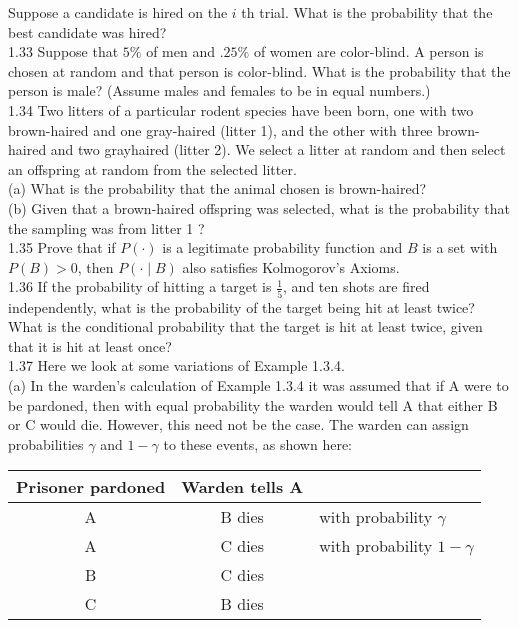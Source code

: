 \documentclass[10pt]{article}
\begin{document}
Suppose a candidate is hired on the $i$ th trial. What is the probability that the best candidate was hired?\\
1.33 Suppose that $5 \%$ of men and $.25 \%$ of women are color-blind. A person is chosen at random and that person is color-blind. What is the probability that the person is male? (Assume males and females to be in equal numbers.)\\
1.34 Two litters of a particular rodent species have been born, one with two brown-haired and one gray-haired (litter 1), and the other with three brown-haired and two grayhaired (litter 2). We select a litter at random and then select an offspring at random from the selected litter.\\
(a) What is the probability that the animal chosen is brown-haired?\\
(b) Given that a brown-haired offspring was selected, what is the probability that the sampling was from litter 1 ?\\
1.35 Prove that if $P(\cdot)$ is a legitimate probability function and $B$ is a set with $P(B)>0$, then $P(\cdot \mid B)$ also satisfies Kolmogorov's Axioms.\\
1.36 If the probability of hitting a target is $\frac{1}{5}$, and ten shots are fired independently, what is the probability of the target being hit at least twice? What is the conditional probability that the target is hit at least twice, given that it is hit at least once?\\
1.37 Here we look at some variations of Example 1.3.4.\\
(a) In the warden's calculation of Example 1.3.4 it was assumed that if A were to be pardoned, then with equal probability the warden would tell A that either B or C would die. However, this need not be the case. The warden can assign probabilities $\gamma$ and $1-\gamma$ to these events, as shown here:

\begin{center}
\begin{tabular}{ccl}
\hline
Prisoner pardoned & Warden tells A &  \\
\hline
A & B dies & with probability $\gamma$ \\
A & C dies & with probability $1-\gamma$ \\
B & C dies &  \\
C & B dies &  \\
\hline
\end{tabular}
\end{center}
\end{document}
